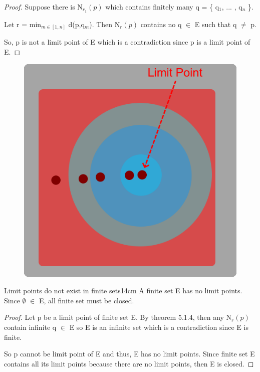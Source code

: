 	\begin{proof}
		Suppose there is N$_{r_1}(p)$ which contains finitely many
		q = \{ q$_1$, ... , q$_n$ \}.

		Let r = min$_{m \in [1,n]}$ d(p,q$_m$). Then N$_r(p)$ contains
		no q $\in$ E such that q $\not =$ p.

		So, p is not a limit point of E which is a contradiction since
		p is a limit point of E.
	\end{proof}



	\begin{figure}[h]
		\centering
		\includegraphics[scale=0.31]{Images/5.1.4.png}
	\end{figure}



	\begin{corollary}{Limit points do not exist in finite sets}{14cm}
		A finite set E has no limit points.
		Since $\emptyset$ $\in$ E, all finite set must be closed.		
	\end{corollary}
	
	\begin{proof}
		Let p be a limit point of finite set E. By {\color{red} theorem 5.1.4}, 
		then any N$_r(p)$ contain infinite q $\in$ E so E is an infinite set
		which is a contradiction since E is finite.

		So p cannot be limit point of E and thus, E has no limit points.
		Since finite set E contains all its limit points because there are no
		limit points, then E is closed.
	\end{proof}

